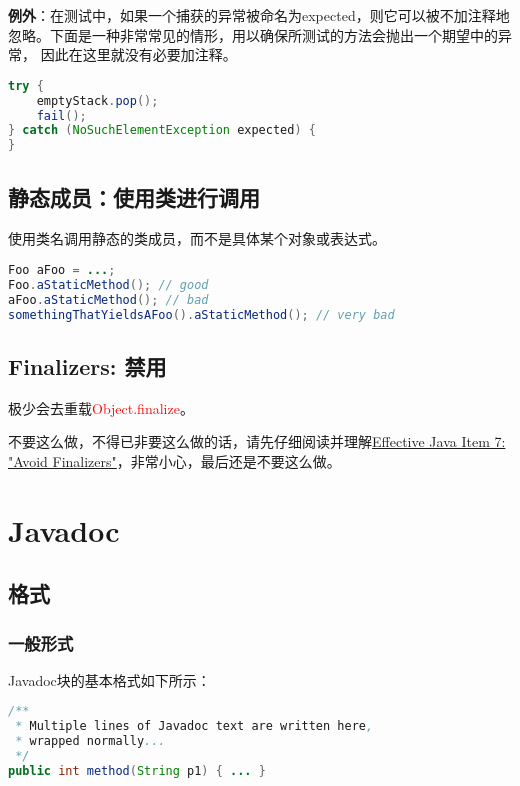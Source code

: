 \documentclass[cn,11pt,chinese]{elegantbook}
\begin{document}
\textbf{例外}：在测试中，如果一个捕获的异常被命名为expected，则它可以被不加注释地忽略。下面是一种非常常见的情形，用以确保所测试的方法会抛出一个期望中的异常， 因此在这里就没有必要加注释。

\begin{lstlisting}[language=java]
try {
	emptyStack.pop();
	fail();
} catch (NoSuchElementException expected) {
}
\end{lstlisting}

\section{静态成员：使用类进行调用}
使用类名调用静态的类成员，而不是具体某个对象或表达式。

\begin{lstlisting}[language=java]
Foo aFoo = ...;
Foo.aStaticMethod(); // good
aFoo.aStaticMethod(); // bad
somethingThatYieldsAFoo().aStaticMethod(); // very bad
\end{lstlisting}

\section{Finalizers: 禁用}

极少会去重载\textcolor{red}{Object.finalize}。

\begin{remark}
	不要这么做，不得已非要这么做的话，请先仔细阅读并理解\href{https://www.google.com/search?hl=zh-CN&tbo=p&tbm=bks&q=isbn:8131726592}{Effective Java Item 7: "Avoid Finalizers"}，非常小心，最后还是不要这么做。
\end{remark}

\chapter{Javadoc}
\section{格式}
\subsection{一般形式}
Javadoc块的基本格式如下所示：
\begin{lstlisting}[language=java]
/**
 * Multiple lines of Javadoc text are written here,
 * wrapped normally...
 */
public int method(String p1) { ... }
\end{lstlisting}
\end{document}
